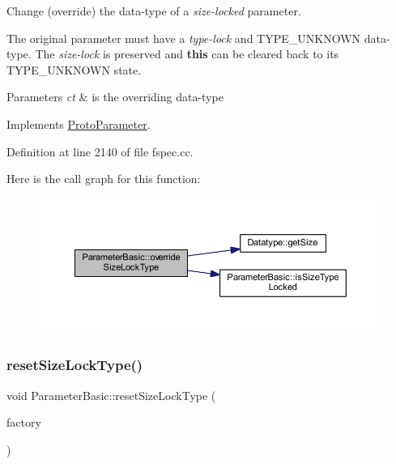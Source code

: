 Change (override) the data-\/type of a {\itshape size-\/locked} parameter. 

The original parameter must have a {\itshape type-\/lock} and T\+Y\+P\+E\+\_\+\+U\+N\+K\+N\+O\+WN data-\/type. The {\itshape size-\/lock} is preserved and {\bfseries{this}} can be cleared back to its T\+Y\+P\+E\+\_\+\+U\+N\+K\+N\+O\+WN state. 
\begin{DoxyParams}{Parameters}
{\em ct} & is the overriding data-\/type \\
\hline
\end{DoxyParams}


Implements \mbox{\hyperlink{class_proto_parameter_a05418aa9f8e8fa0c7499b99cd51e24d3}{Proto\+Parameter}}.



Definition at line 2140 of file fspec.\+cc.

Here is the call graph for this function\+:
\nopagebreak
\begin{figure}[H]
\begin{center}
\leavevmode
\includegraphics[width=350pt]{class_parameter_basic_a1653c7aaf1e1883127707f4e25d7d564_cgraph}
\end{center}
\end{figure}
\mbox{\label{class_parameter_basic_ac3aed750efa13f72a9a674ceb666eb9a}} 
\subsubsection{\texorpdfstring{resetSizeLockType()}{resetSizeLockType()}}
{\footnotesize\ttfamily void Parameter\+Basic\+::reset\+Size\+Lock\+Type (\begin{DoxyParamCaption}\item[{\mbox{\hyperlink{class_type_factory}{Type\+Factory}} $\ast$}]{factory }\end{DoxyParamCaption})\hspace{0.3cm}{\ttfamily [virtual]}}



